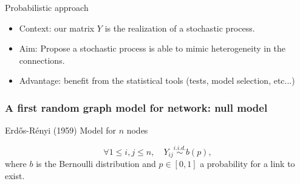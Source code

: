 \documentclass[compress,10pt]{beamer}
\begin{document}
\begin{frame}{Probabilistic approach}
\begin{itemize}
\item 
\alert{Context}: our   matrix $Y$ is the realization of a stochastic process.
\item 
\alert{Aim}: Propose a  stochastic process is able to mimic heterogeneity in the connections.  
\item \alert{Advantage}: benefit from the statistical tools (tests,  model selection, etc...)  
\end{itemize}

\end{frame}


\begin{frame}
\frametitle{A first random graph model for network: null model}

\textcolor{mygreen}{Erd\H{o}s-Rényi (1959)} Model for $n$ nodes 

$$\forall 1\le i,j\le n,\quad Y_{ij}\overset{i.i.d.}{\sim} b(p),$$
where $b$ is the Bernoulli distribution and $p\in[0,1]$ a probability for a link to exist. 



\end{frame}
\end{document}
